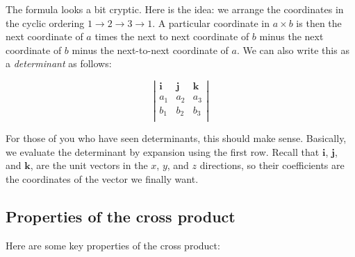\documentclass[10pt]{amsart}
\begin{document}
The formula looks a bit cryptic. Here is the idea: we arrange the
coordinates in the cyclic ordering $1 \to 2 \to 3 \to 1$. A particular
coordinate in $a \times b$ is then the next coordinate of $a$ times
the next to next coordinate of $b$ minus the next coordinate of $b$
minus the next-to-next coordinate of $a$. We can also write this as a
{\em determinant} as follows:

$$\left|\begin{array}{lll} \mathbf{i} & \mathbf{j} & \mathbf{k} \\ a_1 & a_2 & a_3 \\ b_1 & b_2 & b_3 \\\end{array}\right|$$

For those of you who have seen determinants, this should make
sense. Basically, we evaluate the determinant by expansion using the
first row. Recall that $\mathbf{i}$, $\mathbf{j}$, and $\mathbf{k}$,
are the unit vectors in the $x$, $y$, and $z$ directions, so their
coefficients are the coordinates of the vector we finally want.

\subsection{Properties of the cross product}

Here are some key properties of the cross product:
\end{document}
